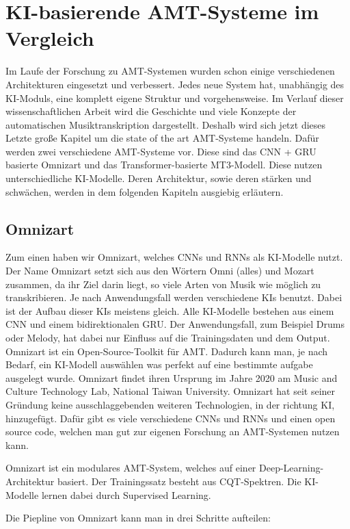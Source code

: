 \section{KI-basierende AMT-Systeme im Vergleich}
Im Laufe der Forschung zu AMT-Systemen wurden schon einige verschiedenen Architekturen eingesetzt und verbessert.
Jedes neue System hat, unabhängig des KI-Moduls, eine komplett eigene Struktur und vorgehensweise.
Im Verlauf dieser wissenschaftlichen Arbeit wird die Geschichte
und viele Konzepte der automatischen Musiktranskription dargestellt.
Deshalb wird sich jetzt dieses Letzte große Kapitel um die state of the art AMT-Systeme handeln.
Dafür werden zwei verschiedene AMT-Systeme vor.
Diese sind das CNN + GRU basierte Omnizart und das Transformer-basierte MT3-Modell.
Diese nutzen unterschiedliche KI-Modelle.
Deren Architektur, sowie deren stärken und schwächen, werden in dem folgenden Kapiteln ausgiebig erläutern.

\subsection{Omnizart}
Zum einen haben wir Omnizart, welches CNNs und RNNs als KI-Modelle nutzt.
\cite{wu2021omnizart}
Der Name Omnizart setzt sich aus den Wörtern Omni (alles) und Mozart zusammen,
da ihr Ziel darin liegt, so viele Arten von Musik wie möglich zu transkribieren.
Je nach Anwendungsfall werden verschiedene KIs benutzt.
Dabei ist der Aufbau dieser KIs meistens gleich.
Alle KI-Modelle bestehen aus einem CNN und einem bidirektionalen GRU.
Der Anwendungsfall, zum Beispiel Drums oder Melody, hat dabei nur Einfluss auf die Trainingsdaten und dem Output.
Omnizart ist ein Open-Source-Toolkit für AMT.
Dadurch kann man, je nach Bedarf, ein KI-Modell auswählen was perfekt auf eine bestimmte aufgabe ausgelegt wurde.
Omnizart findet ihren Ursprung im Jahre 2020 am Music and Culture Technology Lab, National Taiwan University.
Omnizart hat seit seiner Gründung keine ausschlaggebenden weiteren Technologien, in der richtung KI, hinzugefügt.
Dafür gibt es viele verschiedene CNNs und RNNs und einen open source code,
welchen man gut zur eigenen Forschung an AMT-Systemen nutzen kann.

Omnizart ist ein modulares AMT-System, welches auf einer Deep-Learning-Architektur basiert.
Der Trainingssatz besteht aus CQT-Spektren.
Die KI-Modelle lernen dabei durch Supervised Learning.

Die Piepline von Omnizart kann man in drei Schritte aufteilen:


